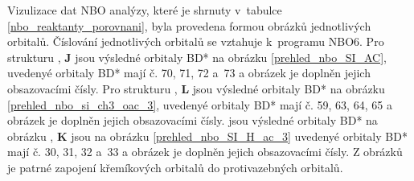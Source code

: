 \documentclass[
digital, %
table,   %
lof,     %
lot,     %
oneside,
]{fithesis3}
\begin{document}
Vizulizace dat NBO analýzy, které je shrnuty v~tabulce \ref{nbo_reaktanty_porovnani}, byla provedena formou obrázků jednotlivých orbitalů. Číslování jednotlivých orbitalů se vztahuje k~programu NBO6. Pro strukturu , \textbf{J} jsou výsledné orbitaly BD* na obrázku \ref{prehled_nbo_SI_AC}, uvedenyé orbitaly BD* mají č. 70, 71, 72 a~73 a obrázek je doplněn jejich obsazovacími čísly. Pro strukturu , \textbf{L} jsou výsledné orbitaly BD* na obrázku \ref{prehled_nbo_si_ch3_oac_3}, uvedenyé orbitaly BD* mají č. 59, 63, 64, 65 a obrázek je doplněn jejich obsazovacími čísly. jsou výsledné orbitaly BD* na obrázku , \textbf{K} jsou na obrázku \ref{prehled_nbo_SI_H_ac_3} uvedenyé orbitaly BD* mají č. 30, 31, 32 a~33 a obrázek je doplněn jejich obsazovacími čísly. Z obrázků je patrné zapojení křemíkových orbitalů do protivazebných orbitalů. \\
\end{document}

